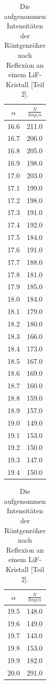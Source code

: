 \begin{table}
  \centering
  \caption{Die aufgenommen Intensitäten der Röntgenröhre nach Reflexion an einem LiF-Kristall [Teil 2].}
  \begin{tabular}[t]{cc}
  \toprule
  $\alpha$ & $\frac{N}{Imp/\si{\second}}$ \\
  \midrule
  16.6 & 211.0  \\
  16.7 & 206.0  \\
  16.8 & 205.0  \\
  16.9 & 198.0  \\
  17.0 & 203.0  \\
  17.1 & 199.0  \\
  17.2 & 198.0  \\
  17.3 & 191.0  \\
  17.4 & 192.0  \\
  17.5 & 184.0  \\
  17.6 & 191.0  \\
  17.7 & 188.0  \\
  17.8 & 181.0  \\
  17.9 & 185.0  \\
  18.0 & 184.0  \\
  18.1 & 179.0  \\
  18.2 & 180.0  \\
  18.3 & 166.0  \\
  18.4 & 173.0  \\
  18.5 & 167.0  \\
  18.6 & 169.0  \\
  18.7 & 160.0  \\
  18.8 & 159.0  \\
  18.9 & 157.0  \\
  19.0 & 149.0  \\
  19.1 & 153.0  \\
  19.2 & 150.0  \\
  19.3 & 147.0  \\
  19.4 & 150.0\\
  \bottomrule
  \end{tabular}
  \begin{tabular}[t]{cc}
  \toprule
  $\alpha$ & $\frac{N}{Imp/\si{\second}}$ \\
  \midrule
  19.5 & 148.0\\
  19.6 & 149.0\\
  19.7 & 143.0\\
  19.8 & 153.0\\
  19.9 & 182.0\\
  20.0 & 291.0\\

\end{tabular}
\end{table}
